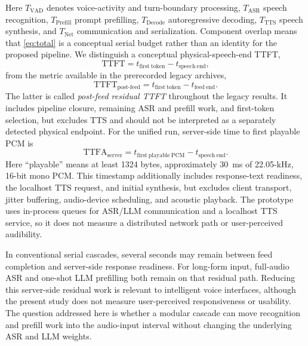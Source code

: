 \documentclass[conference]{IEEEtran}
\begin{document}
Here $T_{\mathrm{VAD}}$ denotes voice-activity and turn-boundary processing, $T_{\mathrm{ASR}}$ speech recognition, $T_{\mathrm{Prefill}}$ prompt prefilling, $T_{\mathrm{Decode}}$ autoregressive decoding, $T_{\mathrm{TTS}}$ speech synthesis, and $T_{\mathrm{Net}}$ communication and serialization. Component overlap means that \eqref{eq:total} is a conceptual serial budget rather than an identity for the proposed pipeline. We distinguish a conceptual physical-speech-end TTFT,
\begin{equation}
\mathrm{TTFT}=t_{\mathrm{first\ token}}-t_{\mathrm{speech\ end}},
\label{eq:ttft}
\end{equation}
from the metric available in the prerecorded legacy archives,
\begin{equation}
\mathrm{TTFT}_{\mathrm{post\text{-}feed}}=t_{\mathrm{first\ token}}-t_{\mathrm{feed\ end}}.
\label{eq:ttftfeed}
\end{equation}
The latter is called \emph{post-feed residual TTFT} throughout the legacy results. It includes pipeline closure, remaining ASR and prefill work, and first-token selection, but excludes TTS and should not be interpreted as a separately detected physical endpoint. For the unified run, server-side time to first playable PCM is
\begin{equation}
\mathrm{TTFA}_{\mathrm{server}}=t_{\mathrm{first\ playable\ PCM}}-t_{\mathrm{speech\ end}}.
\label{eq:ttfa}
\end{equation}
Here ``playable'' means at least 1324 bytes, approximately 30~ms of 22.05-kHz, 16-bit mono PCM. This timestamp additionally includes response-text readiness, the localhost TTS request, and initial synthesis, but excludes client transport, jitter buffering, audio-device scheduling, and acoustic playback. The prototype uses in-process queues for ASR/LLM communication and a localhost TTS service, so it does not measure a distributed network path or user-perceived audibility.

In conventional serial cascades, several seconds may remain between feed completion and server-side response readiness. For long-form input, full-audio ASR and one-shot LLM prefilling both remain on that residual path. Reducing this server-side residual work is relevant to intelligent voice interfaces, although the present study does not measure user-perceived responsiveness or usability. The question addressed here is whether a modular cascade can move recognition and prefill work into the audio-input interval without changing the underlying ASR and LLM weights.
\end{document}
